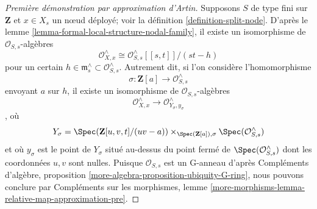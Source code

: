 \begin{proof}[Première démonstration par approximation d'Artin]
\medskip\noindent
Supposons $S$ de type fini sur $\mathbf{Z}$ et $x \in X_s$ un nœud déployé; voir la définition \ref{definition-split-node}. D'après le lemme \ref{lemma-formal-local-structure-nodal-family}, il existe un isomorphisme de $\mathcal{O}_{S, s}$-algèbres $$
\mathcal{O}_{X, x}^\wedge \cong
\mathcal{O}_{S, s}^\wedge[[s, t]]/(st - h)
$$ pour un certain $h \in \mathfrak m_s^\wedge \subset \mathcal{O}_{S, s}^\wedge$. Autrement dit, si l'on considère l'homomorphisme $$
\sigma : \mathbf{Z}[a] \longrightarrow \mathcal{O}_{S, s}^\wedge
$$ envoyant $a$ sur $h$, il existe un isomorphisme de $\mathcal{O}_{S, s}$-algèbres $$
\mathcal{O}_{X, x}^\wedge
\longrightarrow
\mathcal{O}_{Y_\sigma, y_\sigma}^\wedge
$$, où $$
Y_\sigma = \Spec(\mathbf{Z}[u, v, t]/(uv - a))
\times_{\Spec(\mathbf{Z}[a]), \sigma} \Spec(\mathcal{O}_{S, s}^\wedge)
$$ et où $y_\sigma$ est le point de $Y_\sigma$ situé au-dessus du point fermé de $\Spec(\mathcal{O}_{S, s}^\wedge)$ dont les coordonnées $u, v$ sont nulles. Puisque $\mathcal{O}_{S, s}$ est un G-anneau d'après Compléments d'algèbre, proposition \ref{more-algebra-proposition-ubiquity-G-ring}, nous pouvons conclure par Compléments sur les morphismes, lemme \ref{more-morphisms-lemma-relative-map-approximation-pre}.
\end{proof}

